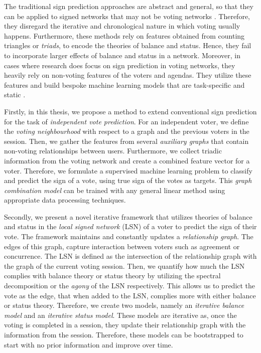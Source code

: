 The traditional sign prediction approaches are abstract and general, so that they can be applied to signed networks that may not be voting networks \cite{agrawal2013link,khodadadi2017sign,Shuang-Hong2012Friend}.
Therefore, they disregard the iterative and chronological nature in which voting usually happens.
Furthermore, these methods rely on features obtained from counting triangles or \textit{triads}, to encode the theories of balance and status.
Hence, they fail to incorporate larger effects of balance and status in a network.
Moreover, in cases where research does focus on sign prediction in voting networks, they heavily rely on non-voting features of the voters and agendas.
They utilize these features and build bespoke machine learning models that are task-specific and static \cite{karimi2019multicongress,jankowski-lorek2013MBSN}.

Firstly, in this thesis, we propose a method to extend conventional sign prediction for the task of \textit{independent vote prediction}.
For an independent voter, we define the \textit{voting neighbourhood} with respect to a graph and the previous voters in the session.
Then, we gather the features from several \textit{auxiliary graphs} that contain non-voting relationships between users.
Furthermore, we collect triadic information from the voting network and create a combined feature vector for a voter.
Therefore, we formulate a supervised machine learning problem to classify and predict the sign of a vote, using true sign of the votes as targets.
This \textit{graph combination model} can be trained with any general linear method using appropriate data processing techniques.

Secondly, we present a novel iterative framework that utilizes theories of balance and status in the \textit{local signed network} (LSN) of a voter to predict the sign of their vote.
The framework maintains and constantly updates a \textit{relationship graph}.
The edges of this graph, capture interaction between voters such as agreement or concurrence.
The LSN is defined as the intersection of the relationship graph with the graph of the current voting session.
Then, we quantify how much the LSN complies with balance theory or status theory by utilizing the spectral decomposition or the \textit{agony} of the LSN respectively.
This allows us to predict the vote as the edge, that when added to the LSN, complies more with either balance or status theory.
Therefore, we create two models, namely an \textit{iterative balance model} and an \textit{iterative status model}.
These models are iterative as, once the voting is completed in a session, they update their relationship graph with the information from the session.
Therefore, these models can be bootstrapped to start with no prior information and improve over time.

